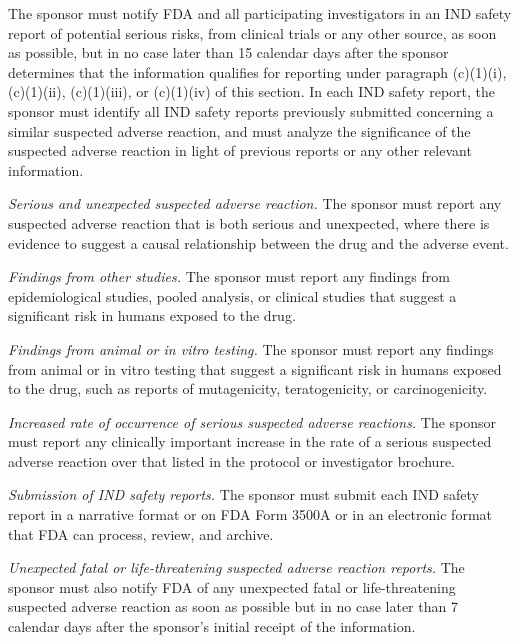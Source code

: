 \documentclass[11pt]{article}
\begin{document}
\begin{description}[leftmargin=0.5cm,style=sameline]
\item[(1)] The sponsor must notify FDA and all participating investigators in an IND safety report of potential serious risks, from clinical trials or any other source, as soon as possible, but in no case later than 15 calendar days after the sponsor determines that the information qualifies for reporting under paragraph (c)(1)(i), (c)(1)(ii), (c)(1)(iii), or (c)(1)(iv) of this section. In each IND safety report, the sponsor must identify all IND safety reports previously submitted concerning a similar suspected adverse reaction, and must analyze the significance of the suspected adverse reaction in light of previous reports or any other relevant information.

\begin{description}[leftmargin=0.8cm,style=sameline]
\item[(i)] \textit{Serious and unexpected suspected adverse reaction.} The sponsor must report any suspected adverse reaction that is both serious and unexpected, where there is evidence to suggest a causal relationship between the drug and the adverse event.
\item[(ii)] \textit{Findings from other studies.} The sponsor must report any findings from epidemiological studies, pooled analysis, or clinical studies that suggest a significant risk in humans exposed to the drug.
\item[(iii)] \textit{Findings from animal or in vitro testing.} The sponsor must report any findings from animal or in vitro testing that suggest a significant risk in humans exposed to the drug, such as reports of mutagenicity, teratogenicity, or carcinogenicity.
\item[(iv)] \textit{Increased rate of occurrence of serious suspected adverse reactions.} The sponsor must report any clinically important increase in the rate of a serious suspected adverse reaction over that listed in the protocol or investigator brochure.
\item[(v)] \textit{Submission of IND safety reports.} The sponsor must submit each IND safety report in a narrative format or on FDA Form 3500A or in an electronic format that FDA can process, review, and archive.
\end{description}

\item[(2)] \textit{Unexpected fatal or life-threatening suspected adverse reaction reports.} The sponsor must also notify FDA of any unexpected fatal or life-threatening suspected adverse reaction as soon as possible but in no case later than 7 calendar days after the sponsor's initial receipt of the information.


\end{description}
\end{document}
